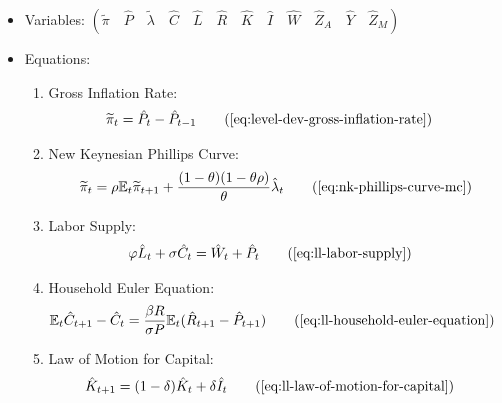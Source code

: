 \documentclass[
	12pt, 
	]{article}
\numberwithin{equation}{section}
\DeclareMathOperator{\dif}{d}
\newcommand{\E}[1][t]{{\mathbb{E}_{#1}}}
\theoremstyle{definition}
\theoremstyle{plain}
\theoremstyle{plain}
\theoremstyle{plain}
\begin{document}
{\singlespacing

\begin{itemize}
	
	\item Variables: \( \left( \tilde{\pi} \quad \hat{P} \quad \tilde{\lambda} \quad \hat{C} \quad \hat{L} \quad \hat{R} \quad \hat{K} \quad \hat{I} \quad \hat{W} \quad \hat{Z}_A \quad \hat{Y} \quad \hat{Z}_M \right) \)
	
	\item Equations:

	\begin{enumerate}
			
		\item Gross Inflation Rate:
		\begin{align}
			\widetilde{\pi}_t &= \hat{P}_t - \hat{P}_{t-1}
			\tag{\ref{eq:level-dev-gross-inflation-rate}}
		\end{align}
		
		\item New Keynesian Phillips Curve:
		\begin{align}
			\widetilde{\pi}_t = \rho \E \widetilde{\pi}_{t+1} + \frac{(1-\theta) (1- \theta \rho)}{\theta} \hat{\lambda}_t
			\tag{\ref{eq:nk-phillips-curve-mc}}
		\end{align}
	
		\item Labor Supply:
		\begin{align}
			\varphi \hat{L}_t + \sigma \hat{C}_t &= \hat{W}_t + \hat{P}_t
			\tag{\ref{eq:ll-labor-supply}}
		\end{align}
		
		\item Household Euler Equation:
		\begin{align}
			\E \hat{C}_{t+1} - \hat{C}_t &= \frac{\beta R}{\sigma P} \E(\hat{R}_{t+1} - \hat{P}_{t+1})
			\tag{\ref{eq:ll-household-euler-equation}}
		\end{align}
		
		\item Law of Motion for Capital:
		\begin{align}
			\hat{K}_{t+1} &= (1-\delta)\hat{K}_t + \delta \hat{I}_t
			\tag{\ref{eq:ll-law-of-motion-for-capital}}
		\end{align}
		
		

\end{enumerate}
\end{itemize}}
\end{document}
